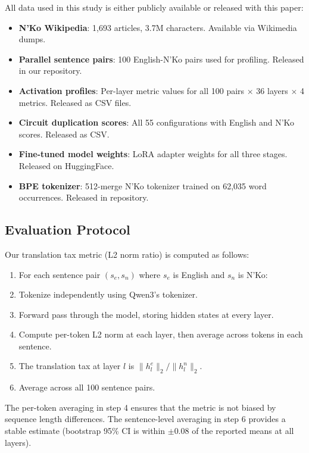 \documentclass[11pt]{article}
\begin{document}
All data used in this study is either publicly available or released with this paper:
\begin{itemize}
\item \textbf{N'Ko Wikipedia}: 1,693 articles, 3.7M characters. Available via Wikimedia dumps.
\item \textbf{Parallel sentence pairs}: 100 English-N'Ko pairs used for profiling. Released in our repository.
\item \textbf{Activation profiles}: Per-layer metric values for all 100 pairs $\times$ 36 layers $\times$ 4 metrics. Released as CSV files.
\item \textbf{Circuit duplication scores}: All 55 configurations with English and N'Ko scores. Released as CSV.
\item \textbf{Fine-tuned model weights}: LoRA adapter weights for all three stages. Released on HuggingFace.
\item \textbf{BPE tokenizer}: 512-merge N'Ko tokenizer trained on 62,035 word occurrences. Released in repository.
\end{itemize}

\subsection{Evaluation Protocol}

Our translation tax metric (L2 norm ratio) is computed as follows:

\begin{enumerate}
\item For each sentence pair $(s_e, s_n)$ where $s_e$ is English and $s_n$ is N'Ko:
\item Tokenize independently using Qwen3's tokenizer.
\item Forward pass through the model, storing hidden states at every layer.
\item Compute per-token L2 norm at each layer, then average across tokens in each sentence.
\item The translation tax at layer $l$ is $\|h_l^e\|_2 / \|h_l^n\|_2$.
\item Average across all 100 sentence pairs.
\end{enumerate}

The per-token averaging in step 4 ensures that the metric is not biased by sequence length differences.
The sentence-level averaging in step 6 provides a stable estimate (bootstrap 95\% CI is within $\pm$0.08 of the reported means at all layers).
\end{document}
